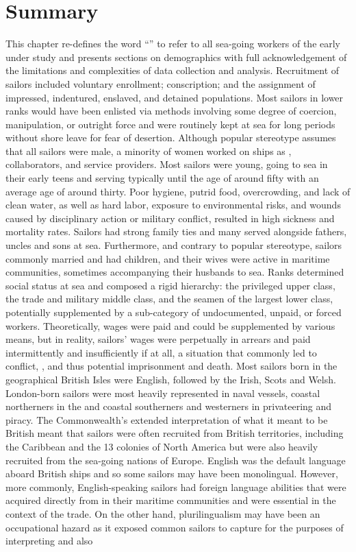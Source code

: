 \section{{Summary}}\label{sec:3.13}

  This chapter re-defines the word “” to refer to all sea-going workers of the early  under study and presents sections on demographics with full acknowledgement of the limitations and complexities of data collection and analysis. Recruitment of sailors included voluntary enrollment; conscription; and the assignment of impressed, indentured, enslaved, and detained populations. Most sailors in lower ranks would have been enlisted via methods involving some degree of coercion, manipulation, or outright force and were routinely kept at sea for long periods without shore leave for fear of desertion. Although popular stereotype assumes that all sailors were male, a minority of women worked on ships as , collaborators, and service providers. Most sailors were young, going to sea in their early teens and serving typically until the age of around fifty with an average  age of around thirty. Poor hygiene, putrid food, overcrowding, and lack of clean water, as well as hard labor, exposure to environmental risks, and wounds caused by disciplinary action or military conflict, resulted in high sickness and mortality rates. Sailors had strong family ties and many served alongside fathers, uncles and sons at sea. Furthermore, and contrary to popular stereotype, sailors commonly married and had children, and their wives were active in maritime communities, sometimes accompanying their husbands to sea. Ranks determined social status at sea and composed a rigid hierarchy: the privileged upper class, the trade and military middle class, and the seamen of the largest lower class, potentially supplemented by a sub-category of undocumented, unpaid, or forced workers. Theoretically, wages were paid and could be supplemented by various means, but in reality, sailors’ wages were perpetually in arrears and paid intermittently and insufficiently if at all, a situation that commonly led to conflict, , and thus potential imprisonment and death. Most sailors born in the geographical British Isles were English, followed by the Irish, Scots and Welsh.  London{}-born sailors were most heavily represented in naval vessels, coastal northerners in the  and coastal southerners and westerners in privateering and piracy. The Commonwealth’s extended interpretation of what it meant to be British meant that sailors were often recruited from British territories, including the Caribbean and the 13 colonies of North America but were also heavily recruited from the sea-going nations of Europe. English was the default language aboard British ships and so some sailors may have been monolingual. However, more commonly, English-speaking sailors had foreign language abilities that were acquired directly from  in their maritime communities and were essential in the context of the  trade. On the other hand, plurilingualism may have been an occupational hazard as it exposed common sailors to capture for the purposes of interpreting and also 